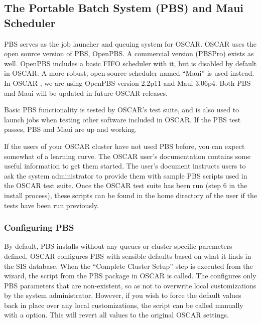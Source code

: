 %
%
%

\subsection{The Portable Batch System (PBS) and Maui Scheduler}
\label{app:pbs-overview}

PBS serves as the job launcher and queuing system for OSCAR.  OSCAR
uses the open source version of PBS, OpenPBS.  A commercial version
(PBSPro) exists as well.  OpenPBS includes a basic FIFO scheduler with
it, but is disabled by default in OSCAR.  A more robust, open source
scheduler named ``Maui'' is used instead.  In OSCAR \oscarversion, we
are using OpenPBS version 2.2p11 and Maui 3.06p4.  Both PBS and Maui
will be updated in future OSCAR releases.

Basic PBS functionality is tested by OSCAR's test suite, and is also
used to launch jobs when testing other software included in OSCAR.  If
the PBS test passes, PBS and Maui are up and working.  

If the users of your OSCAR cluster have not used PBS before, you can
expect somewhat of a learning curve.  The OSCAR user's documentation
contains some useful information to get them started.  The user's
document instructs users to ask the system administrator to provide
them with sample PBS scripts used in the OSCAR test suite.  Once the
OSCAR test suite has been run (step 6 in the install process), these
scripts can be found in the home directory of the  user
if the tests have been run previously.

\subsubsection{Configuring PBS}

By default, PBS installs without any queues or cluster specific
paremeters defined.  OSCAR configures PBS with sensible defaults based
on what it finds in the SIS database.  When the ``Complete Cluster
Setup'' step is executed from the wizard, the 
script from the PBS package in OSCAR is called.  The
 configures only PBS parameters that are
non-existent, so as not to overwrite local customizations by the
system administrator.  However, if you wish to force the default
values back in place over any local customizations, the
 script can be called manually with a
 option.  This will revert all values to the original
OSCAR settings.

